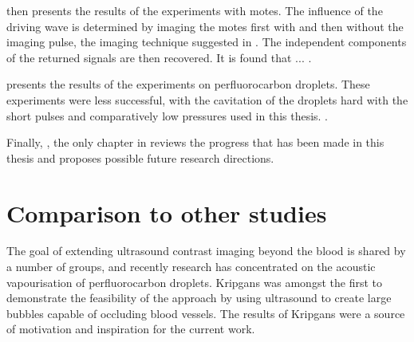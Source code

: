  then presents the results of the experiments with  motes.
The influence of the driving wave is determined by 
imaging the motes first with and then without the imaging pulse,
the imaging technique suggested in .
The independent components
of the returned signals are then recovered. 
It is found that ... .

 presents the results of the experiments on perfluorocarbon droplets.
These experiments were less successful,
with the cavitation of the droplets hard 
with the short pulses and comparatively low pressures used in this thesis.
.


Finally, , the only chapter in 
reviews the progress that has been made in this thesis
and proposes possible future research directions.



\section{Comparison to other studies}

The goal of extending ultrasound contrast imaging beyond the blood is shared by a number of groups,
and recently research has concentrated on the acoustic vapourisation of perfluorocarbon droplets\cite{Burns2010,Rapoport2007,Fabiilli2010,Giesecke2003,Couture2006}.
Kripgans\cite{Kripfgans2000, Kripfgans2002, Kripfgans2004} was amongst the first 
to demonstrate the feasibility of the approach %
by using ultrasound to create large bubbles capable of occluding blood vessels.
The results of Kripgans were a source of motivation and inspiration for the current work.


